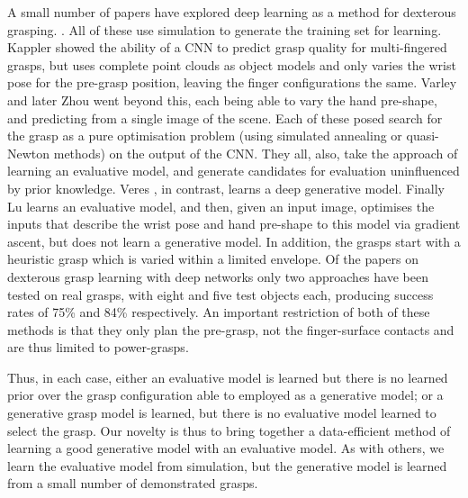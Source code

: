 A small number of papers have explored deep learning as a method for dexterous grasping. \cite{lu2017planning,varley2015generating,veres2017modeling,zhou20176dof,kappler2015leveraging}. All of these use simulation to generate the training set for learning. Kappler \cite{kappler2015leveraging} showed the ability of a CNN to predict grasp quality for multi-fingered grasps, but uses complete point clouds as object models and only varies the wrist pose for the pre-grasp position, leaving the finger configurations the same. Varley \cite{varley2015generating} and later Zhou \cite{zhou20176dof} went beyond this, each being able to vary the hand pre-shape, and predicting from a single image of the scene. Each of these posed search for the grasp as a pure optimisation problem (using simulated annealing or quasi-Newton methods) on the output of the CNN. They all, also, take the approach of learning an evaluative model, and generate candidates for evaluation uninfluenced by prior knowledge. Veres \cite{veres2017modeling}, in contrast, learns a deep generative model. Finally Lu \cite{lu2017planning} learns an evaluative model, and then, given an input image, optimises the inputs that describe the wrist pose and hand pre-shape to this model via gradient ascent, but does not learn a generative model. In addition, the grasps start with a heuristic grasp which is varied within a limited envelope. Of the papers on dexterous grasp learning with deep networks only two approaches \cite{varley2015generating,lu2017planning} have been tested on real grasps, with eight and five test objects each, producing success rates of 75\% and 84\% respectively. An important restriction of both of these methods is that they only plan the pre-grasp, not the finger-surface contacts and are thus limited to power-grasps.

Thus, in each case, either an evaluative model is learned but there is no learned prior over the grasp configuration able to employed as a generative model; or a generative grasp model is learned, but there is no evaluative model learned to select the grasp. Our novelty is thus to bring together a data-efficient method of learning a good generative model with an evaluative model. As with others, we learn the evaluative model from simulation, but the generative model is learned from a small number of demonstrated grasps. 


